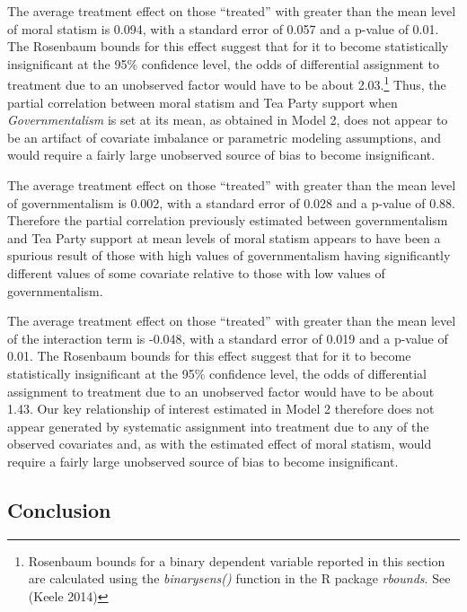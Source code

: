 \documentclass[12pt,]{article}
\let\rmarkdownfootnote\footnote%
\def\footnote{\protect\rmarkdownfootnote}
\begin{document}
The average treatment effect on those ``treated'' with greater than the
mean level of moral statism is 0.094, with a standard error of 0.057 and
a p-value of 0.01. The Rosenbaum bounds for this effect suggest that for
it to become statistically insignificant at the 95\% confidence level,
the odds of differential assignment to treatment due to an unobserved
factor would have to be about 2.03.\footnote{Rosenbaum bounds for a
  binary dependent variable reported in this section are calculated
  using the \emph{binarysens()} function in the R package
  \emph{rbounds}. See (Keele 2014)} Thus, the partial correlation
between moral statism and Tea Party support when \emph{Governmentalism}
is set at its mean, as obtained in Model 2, does not appear to be an
artifact of covariate imbalance or parametric modeling assumptions, and
would require a fairly large unobserved source of bias to become
insignificant.

The average treatment effect on those ``treated'' with greater than the
mean level of governmentalism is 0.002, with a standard error of 0.028
and a p-value of 0.88. Therefore the partial correlation previously
estimated between governmentalism and Tea Party support at mean levels
of moral statism appears to have been a spurious result of those with
high values of governmentalism having significantly different values of
some covariate relative to those with low values of governmentalism.

The average treatment effect on those ``treated'' with greater than the
mean level of the interaction term is -0.048, with a standard error of
0.019 and a p-value of 0.01. The Rosenbaum bounds for this effect
suggest that for it to become statistically insignificant at the 95\%
confidence level, the odds of differential assignment to treatment due
to an unobserved factor would have to be about 1.43. Our key
relationship of interest estimated in Model 2 therefore does not appear
generated by systematic assignment into treatment due to any of the
observed covariates and, as with the estimated effect of moral statism,
would require a fairly large unobserved source of bias to become
insignificant.

\subsection{Conclusion}\label{conclusion}
\end{document}
